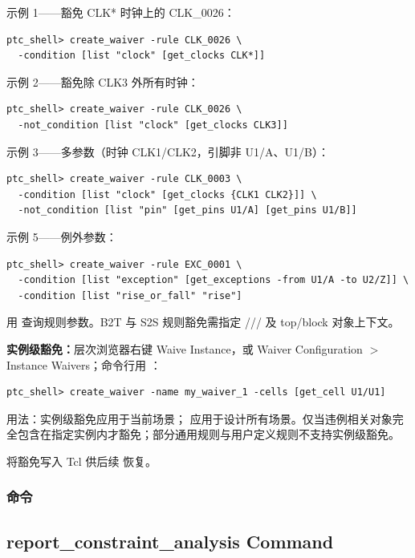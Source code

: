 示例 1——豁免 CLK* 时钟上的 CLK\_0026：
\begin{lstlisting}
ptc_shell> create_waiver -rule CLK_0026 \
  -condition [list "clock" [get_clocks CLK*]]
\end{lstlisting}

示例 2——豁免除 CLK3 外所有时钟：
\begin{lstlisting}
ptc_shell> create_waiver -rule CLK_0026 \
  -not_condition [list "clock" [get_clocks CLK3]]
\end{lstlisting}

示例 3——多参数（时钟 CLK1/CLK2，引脚非 U1/A、U1/B）：
\begin{lstlisting}
ptc_shell> create_waiver -rule CLK_0003 \
  -condition [list "clock" [get_clocks {CLK1 CLK2}]] \
  -not_condition [list "pin" [get_pins U1/A] [get_pins U1/B]]
\end{lstlisting}

示例 5——例外参数：
\begin{lstlisting}
ptc_shell> create_waiver -rule EXC_0001 \
  -condition [list "exception" [get_exceptions -from U1/A -to U2/Z]] \
  -condition [list "rise_or_fall" "rise"]
\end{lstlisting}

用  查询规则参数。B2T 与 S2S 规则豁免需指定 /// 及 top/block 对象上下文。

\textbf{实例级豁免：}层次浏览器右键 Waive Instance，或 Waiver Configuration $>$ Instance Waivers；命令行用 ：
\begin{lstlisting}
ptc_shell> create_waiver -name my_waiver_1 -cells [get_cell U1/U1]
\end{lstlisting}

用法：实例级豁免应用于当前场景； 应用于设计所有场景。仅当违例相关对象完全包含在指定实例内才豁免；部分通用规则与用户定义规则不支持实例级豁免。

 将豁免写入 Tcl 供后续  恢复。

\subsubsection{ 命令}
\subsection*{report\_constraint\_analysis Command}

